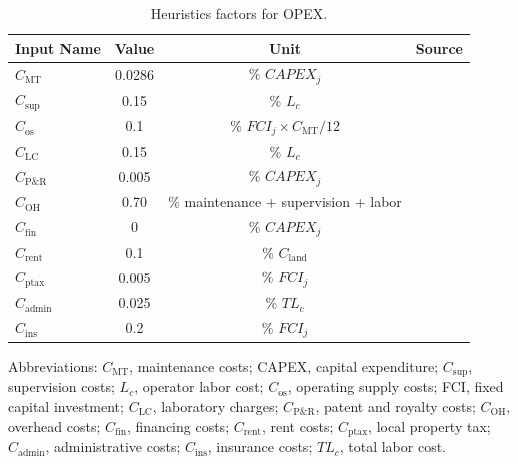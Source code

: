 \documentclass{article}
\begin{document}
\begin{table}[H]
  \centering
  \caption{Heuristics factors for OPEX.}
  \label{table:heuristics_factors_opex}
  \begin{threeparttable}
    \begin{tabular}{@{}lccc@{}}
      \toprule
      \textbf{Input Name} & \textbf{Value} & \textbf{Unit} & \textbf{Source} \\ \midrule
      $C_{\text{MT}}$ & 0.0286 & \% $CAPEX_j$ & \cite{Peters2003} \\
      $C_{\text{sup}}$ & 0.15 & \% $L_c$ & \cite{Peters2003} \\
      $C_{\text{os}}$ & 0.1 & \% $FCI_j \times C_{\text{MT}}/12$ & \cite{Peters2003} \\
      $C_{\text{LC}}$ & 0.15 & \% $L_c$ & \cite{Peters2003} \\
      $C_{\text{P\&R}}$ & 0.005 & \% $CAPEX_j$ & \cite{Peters2003} \\
      $C_{\text{OH}}$ & 0.70 & \% maintenance + supervision + labor & \cite{Peters2003} \\
      $C_{\text{fin}}$ & 0 & \% $CAPEX_j$ & \cite{Peters2003} \\
      $C_{\text{rent}}$ & 0.1 & \% $C_{\text{land}}$ & \cite{Peters2003} \\
      $C_{\text{ptax}}$ & 0.005 & \% $FCI_j$ & \cite{Peters2003} \\
      $C_{\text{admin}}$ & 0.025 & \% $TL_c$ & \cite{Peters2003} \\
      $C_{\text{ins}}$ & 0.2 & \% $FCI_j$ & \cite{Peters2003} \\ \bottomrule
    \end{tabular}
    \begin{tablenotes}
  \small
  \item Abbreviations: $C_{\text{MT}}$, maintenance costs; CAPEX, capital expenditure; $C_{\text{sup}}$, supervision costs; $L_c$, operator labor cost; $C_{\text{os}}$, operating supply costs; FCI, fixed capital investment; $C_{\text{LC}}$, laboratory charges; $C_{\text{P\&R}}$, patent and royalty costs; $C_{\text{OH}}$, overhead costs; $C_{\text{fin}}$, financing costs; $C_{\text{rent}}$, rent costs; $C_{\text{ptax}}$, local property tax; $C_{\text{admin}}$, administrative costs; $C_{\text{ins}}$, insurance costs; $TL_c$, total labor cost.
\end{tablenotes}

  \end{threeparttable}
\end{table}
\end{document}

